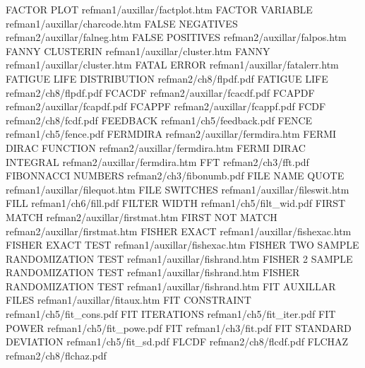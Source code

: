 FACTOR PLOT                             refman1/auxillar/factplot.htm
FACTOR VARIABLE                         refman1/auxillar/charcode.htm
FALSE NEGATIVES                         refman2/auxillar/falneg.htm
FALSE POSITIVES                         refman2/auxillar/falpos.htm
FANNY CLUSTERIN                         refman1/auxillar/cluster.htm
FANNY                                   refman1/auxillar/cluster.htm
FATAL ERROR                             refman1/auxillar/fatalerr.htm
FATIGUE LIFE DISTRIBUTION               refman2/ch8/flpdf.pdf
FATIGUE LIFE                            refman2/ch8/flpdf.pdf
FCACDF                                  refman2/auxillar/fcacdf.pdf
FCAPDF                                  refman2/auxillar/fcapdf.pdf
FCAPPF                                  refman2/auxillar/fcappf.pdf
FCDF                                    refman2/ch8/fcdf.pdf
FEEDBACK                                refman1/ch5/feedback.pdf
FENCE                                   refman1/ch5/fence.pdf
FERMDIRA                                refman2/auxillar/fermdira.htm
FERMI DIRAC FUNCTION                    refman2/auxillar/fermdira.htm
FERMI DIRAC INTEGRAL                    refman2/auxillar/fermdira.htm
FFT                                     refman2/ch3/fft.pdf
FIBONNACCI NUMBERS                      refman2/ch3/fibonumb.pdf
FILE NAME QUOTE                         refman1/auxillar/filequot.htm
FILE SWITCHES                           refman1/auxillar/fileswit.htm
FILL                                    refman1/ch6/fill.pdf
FILTER WIDTH                            refman1/ch5/filt_wid.pdf
FIRST MATCH                             refman2/auxillar/firstmat.htm
FIRST NOT MATCH                         refman2/auxillar/firstmat.htm
FISHER EXACT                            refman1/auxillar/fishexac.htm
FISHER EXACT TEST                       refman1/auxillar/fishexac.htm
FISHER TWO SAMPLE RANDOMIZATION TEST    refman1/auxillar/fishrand.htm
FISHER 2 SAMPLE RANDOMIZATION TEST      refman1/auxillar/fishrand.htm
FISHER RANDOMIZATION TEST               refman1/auxillar/fishrand.htm
FIT AUXILLAR FILES                      refman1/auxillar/fitaux.htm
FIT CONSTRAINT                          refman1/ch5/fit_cons.pdf
FIT ITERATIONS                          refman1/ch5/fit_iter.pdf
FIT POWER                               refman1/ch5/fit_powe.pdf
FIT                                     refman1/ch3/fit.pdf
FIT STANDARD DEVIATION                  refman1/ch5/fit_sd.pdf
FLCDF                                   refman2/ch8/flcdf.pdf
FLCHAZ                                  refman2/ch8/flchaz.pdf
